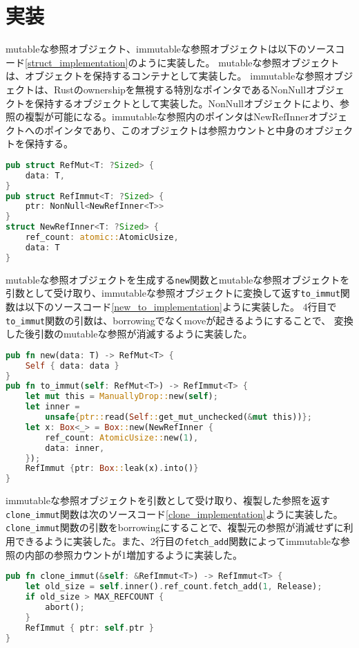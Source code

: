 \documentclass{sumiilab-paper}
\theoremstyle{mystyle}
\numberwithin{definition}{chapter} %
\begin{document}
\section{実装}
mutableな参照オブジェクト、immutableな参照オブジェクトは以下のソースコード\ref{struct_implementation}のように実装した。
mutableな参照オブジェクトは、オブジェクトを保持するコンテナとして実装した。
immutableな参照オブジェクトは、Rustのownershipを無視する特別なポインタであるNonNullオブジェクトを保持するオブジェクトとして実装した。NonNullオブジェクトにより、参照の複製が可能になる。immutableな参照内のポインタはNewRefInnerオブジェクトへのポインタであり、このオブジェクトは参照カウントと中身のオブジェクトを保持する。
\begin{lstlisting}[language=Rust, caption=新たな参照オブジェクトの実装, label=struct_implementation, captionpos=b]
pub struct RefMut<T: ?Sized> {
    data: T,
}
pub struct RefImmut<T: ?Sized> {
    ptr: NonNull<NewRefInner<T>>
}
struct NewRefInner<T: ?Sized> {
    ref_count: atomic::AtomicUsize,
    data: T
}
\end{lstlisting}

mutableな参照オブジェクトを生成する\texttt{new}関数とmutableな参照オブジェクトを引数として受け取り、immutableな参照オブジェクトに変換して返す\texttt{to\_immut}関数は以下のソースコード\ref{new_to_implementation}ように実装した。
4行目で\texttt{to\_immut}関数の引数は、borrowingでなくmoveが起きるようにすることで、
変換した後引数のmutableな参照が消滅するように実装した。
\begin{lstlisting}[language=Rust, caption=関数newと関数to\_immutの実装, label=new_to_implementation, captionpos=b]
pub fn new(data: T) -> RefMut<T> {
    Self { data: data }
}
pub fn to_immut(self: RefMut<T>) -> RefImmut<T> {
    let mut this = ManuallyDrop::new(self);
    let inner =
        unsafe{ptr::read(Self::get_mut_unchecked(&mut this))};
    let x: Box<_> = Box::new(NewRefInner {
        ref_count: AtomicUsize::new(1),
        data: inner,
    });
    RefImmut {ptr: Box::leak(x).into()}
}
\end{lstlisting}

immutableな参照オブジェクトを引数として受け取り、複製した参照を返す\texttt{clone\_immut}関数は次のソースコード\ref{clone_implementation}ように実装した。\texttt{clone\_immut}関数の引数をborrowingにすることで、複製元の参照が消滅せずに利用できるように実装した。また、2行目の\texttt{fetch\_add}関数によってimmutableな参照の内部の参照カウントが1増加するように実装した。
\begin{lstlisting}[language=Rust, caption=関数clone\_immutの実装, label=clone_implementation, captionpos=b]
pub fn clone_immut(&self: &RefImmut<T>) -> RefImmut<T> {
    let old_size = self.inner().ref_count.fetch_add(1, Release);
    if old_size > MAX_REFCOUNT {
        abort();
    }
    RefImmut { ptr: self.ptr }
}
\end{lstlisting}
\end{document}

